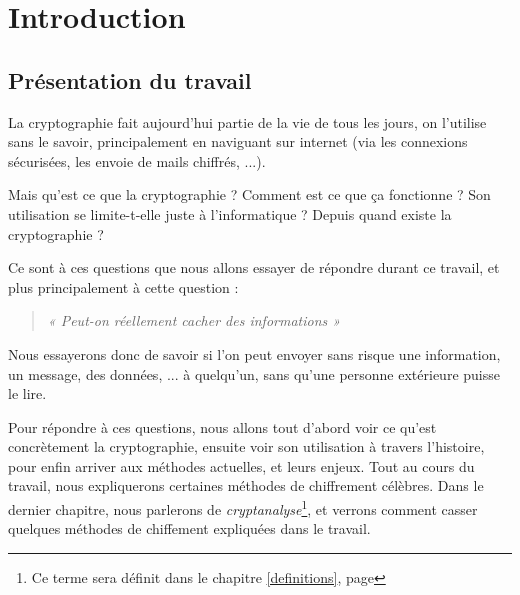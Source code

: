 \chapter{Introduction}

\section{Présentation du travail}
La cryptographie fait aujourd'hui partie de la vie de tous les jours, on l'utilise sans le savoir, principalement en naviguant sur internet (via les connexions sécurisées, les envoie de mails chiffrés, ...).

Mais qu'est ce que la cryptographie ? Comment est ce que ça fonctionne ? Son utilisation se limite-t-elle juste à l'informatique ? Depuis quand existe la cryptographie ?

Ce sont à ces questions que nous allons essayer de répondre durant ce travail, et plus principalement à cette question : 

\begin{quote}
\emph{« Peut-on réellement cacher des informations »}
\end{quote}

Nous essayerons donc de savoir si l'on peut envoyer sans risque une information, un message, des données, ... à quelqu'un, sans qu'une personne extérieure puisse le lire.

Pour répondre à ces questions, nous allons tout d'abord voir ce qu'est concrètement la cryptographie, ensuite voir son utilisation à travers l'histoire, pour enfin arriver aux méthodes actuelles, et leurs enjeux. Tout au cours du travail, nous expliquerons certaines méthodes de chiffrement célèbres. Dans le dernier chapitre, nous parlerons de \emph{cryptanalyse}\footnote{Ce terme sera définit dans le chapitre \ref{definitions}, page \pageref{definitions}}, et verrons comment casser quelques méthodes de chiffement expliquées dans le travail.


